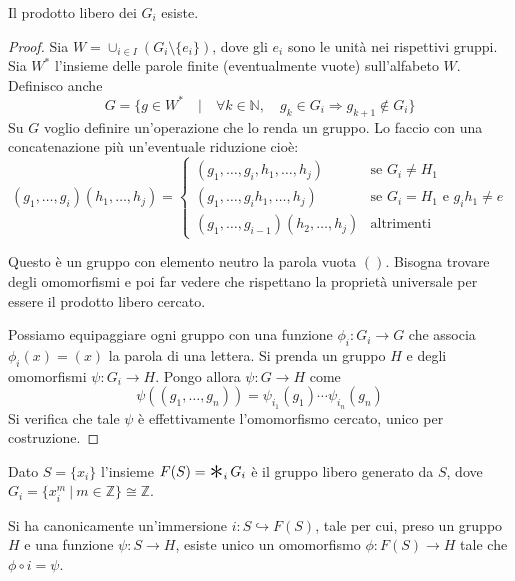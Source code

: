 \begin{prop}
    Il prodotto libero dei $G_i$ esiste.
\end{prop}
\begin{proof}
    Sia $W = \cup_{i\in I}(G_i\setminus \{e_i\})$, dove gli $e_i$ sono le unit\`a nei rispettivi gruppi. Sia $W^*$ l'insieme delle parole finite (eventualmente vuote) sull'alfabeto $W$. Definisco anche
        \[
        G = \{g \in W^* \quad | \quad \forall k \in \mathbb{N},\quad g_k\in G_i \Rightarrow g_{k+1} \notin G_i\}
        \]
        Su $G$ voglio definire un'operazione che lo renda un gruppo. Lo faccio con una concatenazione pi\`u un'eventuale riduzione cio\`e:
        \[
        (g_1, \dots, g_i)(h_1,\dots, h_j) =
        \begin{cases}
            (g_1, \dots, g_i, h_1, \dots, h_j) & \text{se $G_i \neq H_1$}\\
            (g_1, \dots, g_ih_1, \dots, h_j) & \text{se $G_i = H_1$ e $g_ih_1 \neq e$}\\
            (g_1, \dots, g_{i-1})(h_2, \dots, h_j) & \text{altrimenti}

        \end{cases}
        \]

        Questo \`e un gruppo con elemento neutro la parola vuota $()$. Bisogna trovare degli omomorfismi e poi far vedere che rispettano la propriet\`a universale per essere il prodotto libero cercato.

        Possiamo equipaggiare ogni gruppo con una funzione $\phi_i\colon G_i\longrightarrow G$ che associa $\phi_i(x)=(x)$ la parola di una lettera. Si prenda un gruppo $H$ e degli omomorfismi $\psi\colon G_i\longrightarrow H$. Pongo allora $\psi\colon G\longrightarrow H$ come
        \[
            \psi((g_1, \dots, g_n)) = \psi_{i_1}(g_1)\cdots\psi_{i_n}(g_n)
        \]
        Si verifica che tale $\psi$ \`e effettivamente l'omomorfismo cercato, unico per costruzione.
\end{proof}

\begin{defn}
    Dato $S=\{x_i\}$ l'insieme $F(S)=\Conv_i G_i$ \`e il gruppo libero generato da $S$, dove $G_i=\{x_i^m \ |\ m\in\mathbb{Z}\}\cong \mathbb{Z}$.
\end{defn}

\begin{oss}
    Si ha canonicamente un'immersione $i\colon S\hookrightarrow F(S)$, tale per cui, preso un gruppo $H$ e una funzione $\psi\colon S \rightarrow H$, esiste unico un omomorfismo $\phi\colon F(S)\rightarrow H$ tale che $\phi \circ i = \psi$.
\end{oss}

